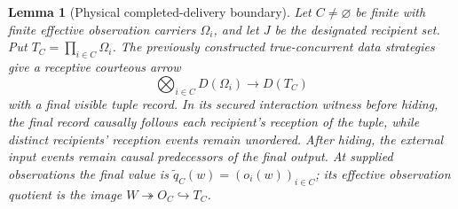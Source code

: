 \documentclass[11pt,a4paper]{article}
\numberwithin{equation}{section}
\newtheorem{lemma}[theorem]{Lemma}
\theoremstyle{definition}
\theoremstyle{remark}
\theoremstyle{plain}
\begin{document}
\begin{lemma}[Physical completed-delivery boundary]
\label{agt-lem-completed-delivery}
Let $C\ne\varnothing$ be finite with finite effective observation
carriers $\Omega_i$, and let $J$ be the designated recipient set. Put
$T_C=\prod_{i\in C}\Omega_i$.  The previously constructed true-concurrent
data strategies give a receptive courteous arrow
\[
 \bigotimes_{i\in C}D(\Omega_i)\longrightarrow D(T_C)
\]
with a final visible tuple record.  In its \emph{secured interaction
witness before hiding}, the final record causally follows each
recipient's reception of the tuple, while distinct recipients' reception
events remain unordered.  After hiding, the external input events remain
causal predecessors of the final output.  At supplied observations the
final value is $\widetilde q_C(w)=(o_i(w))_{i\in C}$; its effective
observation quotient is the image
$W\twoheadrightarrow O_C\hookrightarrow T_C$.
\end{lemma}
\end{document}
